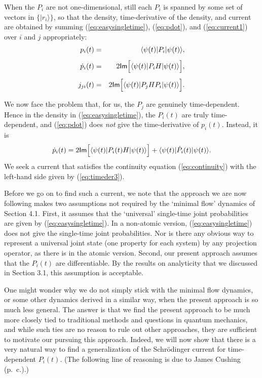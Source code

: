 \documentclass[12pt]{article}
\newcommand{\be}{\vspace*{6pt} \begin{equation}}
\newcommand{\ee}{\vspace*{10pt} \end{equation}}
\renewcommand{\Im}{\mbox{{\sf Im}}}                             %
\newcommand{\bra}[1]{\langle #1\vert}                           %
\newcommand{\ket}[1]{\vert #1\rangle}                           %
\begin{document}
When the $P_i$ are not one-dimensional, still each $P_i$ is spanned by 
some set of vectors in $\{\ket{r_i}\}$, so that the density, 
time-derivative of the density, and current are obtained by summing 
(\ref{eq:easysingletime}), (\ref{eq:pdot}), and (\ref{eq:current1}) 
over $i$ and $j$ appropriately:
\begin{eqnarray}
  \label{eq:density2}
  p_i(t) & = & \bra{\psi(t)} P_i \ket{\psi(t)}, \\[1ex]
  \label{eq:timeder2}
  \dot{p}_i(t) & = & 2 \Im \Big[ \bra{\psi(t)} P_i H
  \ket{\psi(t)} \Big], \\[1ex]
  \label{eq:current2}
  j_{ji}(t) & = & 2 \Im \Big[ \bra{\psi(t)} P_j H P_i
  \ket{\psi(t)} \Big].
\end{eqnarray}

We now face the problem that, for us, the $P_j$ are genuinely
time-dependent.  Hence in the density in (\ref{eq:easysingletime}),
the $P_i(t)$ are truly time-dependent, and (\ref{eq:pdot}) does {\it
not} give the time-derivative of $p_i(t)$.  Instead, it is
\be
  \label{eq:timeder3}
  \dot{p}_i(t) = 2 \Im \Big[ \bra{\psi(t)} P_i(t) H \ket{\psi(t)} 
  \Big] + \bra{\psi(t)}\dot{P}_i(t)\ket{\psi(t)}.
\ee
We seek a current that satisfies the continuity equation 
(\ref{eq:continuity}) with the left-hand side given by 
(\ref{eq:timeder3}).

Before we go on to find such a current, we note that the approach we
are now following makes two assumptions not required by the `minimal
flow' dynamics of Section 4.1.  First, it assumes that the `universal'
single-time joint probabilities are given by (\ref{eq:easysingletime}).
In a non-atomic version, (\ref{eq:easysingletime}) does not give the
single-time joint probabilities.  Nor is there any obvious way to
represent a universal joint state (one property for each system) by
any projection operator, as there is in the atomic version.  Second,
our present approach assumes that the $P_i(t)$ are differentiable.  By
the results on analyticity that we discussed in Section 3.1, this
assumption is acceptable.

One might wonder why we do not simply stick with the minimal flow 
dynamics, or some other dynamics derived in a similar way, when the 
present approach is so much less general.  The answer is that we find 
the present approach to be much more closely tied to traditional 
methods and questions in quantum mechanics, and while such ties are no 
reason to rule out other approaches, they are sufficient to motivate 
our pursuing this approach.  Indeed, we will now show that there is a 
very natural way to find a generalization of the Schr\"odinger current 
for time-dependent $P_i(t)$.  (The following line of reasoning is due 
to James Cushing (p.~c.).)
\end{document}
